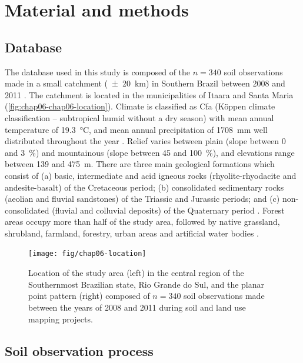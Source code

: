 \section{Material and methods}
\label{sec:chap06-chap06-material-methods}

\subsection{Database}
\label{subsec:chap06-chap06-database}

The database used in this study is composed of the $n = 340$ soil observations made in a small catchment 
(\SI{\pm20}{\km}) in Southern Brazil between \num{2008} and \num{2011} \cite{SamuelRosaEtAl2011a, 
MiguelEtAl2012, Samuel-RosaEtAl2013}. The catchment is located in the municipalities of Itaara and Santa Maria 
(\autoref{fig:chap06-chap06-location}). Climate is classified as Cfa (K{\"o}ppen climate classification -- 
subtropical humid without a dry season) with mean annual temperature of \SI{19.3}{\celsius}, and mean annual 
precipitation of \SI{1708}{\mm} well distributed throughout the year \cite{Maluf2000}. Relief varies between 
plain (slope between \num{0} and \SI{3}{\percent}) and mountainous (slope between \num{45} and 
\SI{100}{\percent}), and elevations range between \num{139} and \SI{475}{\m}. There are three main geological 
formations which consist of (a) basic, intermediate and acid igneous rocks (rhyolite-rhyodacite and 
andesite-basalt) of the Cretaceous period; (b) consolidated sedimentary rocks (aeolian and fluvial sandstones) 
of the Triassic and Jurassic periods; and (c) non-consolidated (fluvial and colluvial deposits) of the 
Quaternary period \cite{GasparettoEtAl1988, MacielFilho1990, Sartori2009}. Forest areas occupy more than half 
of the study area, followed by native grassland, shrubland, farmland, forestry, urban areas and artificial 
water bodies \cite{SamuelRosaEtAl2011a}.

\begin{figure}[!ht]
 \centering
 \texttt{[image: fig/chap06-location]}
 \caption{Location of the study area (left) in the central region of the Southernmost Brazilian state, Rio 
 Grande do Sul, and the planar point pattern (right) composed of $n = 340$ soil observations made between 
 the years of \num{2008} and \num{2011} during soil and land use mapping projects.}
 \label{fig:chap06-chap06-location}
\end{figure}

\subsection{Soil observation process}
\label{subsec:chap06-soil-observation-process}

